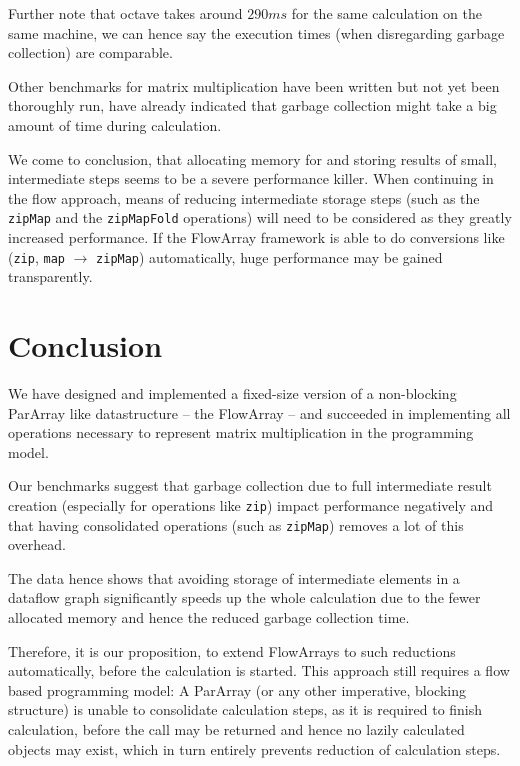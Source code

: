 \documentclass[runningheads,a4paper,fleqn]{llncs}
\begin{document}
Further note that octave \cite{eaton1997gnu} takes around $290 ms$ for
the same calculation on the same machine, we can hence say the
execution times (when disregarding garbage collection) are
comparable.

Other benchmarks for matrix multiplication have been written but not
yet been thoroughly run, have already indicated that garbage
collection might take a big amount of time during calculation.

We come to conclusion, that allocating memory for and
storing results of small, intermediate steps seems to be a severe
performance 
killer. When continuing in the flow approach, means of reducing
intermediate storage steps (such as the
\texttt{zipMap} and the \texttt{zipMapFold} operations) will need to
be considered as they greatly increased performance. If the FlowArray
framework is able to do conversions like (\texttt{zip}, \texttt{map}
$\to$ \texttt{zipMap}) automatically, huge performance may be gained
transparently.

\section{Conclusion}
\label{sec:conclusion}

We have designed and implemented a fixed-size version of a non-blocking
ParArray like datastructure -- the FlowArray -- and succeeded in
implementing all operations necessary to represent matrix
multiplication in the programming model.

Our benchmarks suggest that garbage collection due to full
intermediate result creation (especially for operations like
\texttt{zip}) impact performance negatively and that having
consolidated operations (such as \texttt{zipMap}) removes a lot of
this overhead.

The data hence shows that avoiding storage of intermediate elements in
a dataflow graph significantly speeds up the whole calculation due to the fewer
allocated memory and hence the reduced garbage collection time.

Therefore, it is our proposition, to extend FlowArrays to such
reductions automatically, before the calculation is started. This
approach still requires a flow based programming model: A ParArray (or
any other imperative, blocking structure) is
unable to consolidate calculation steps, as 
it is required to finish calculation, before the call may be returned
and hence no lazily calculated objects may exist, which in turn
entirely prevents reduction of calculation steps.



\end{document}

